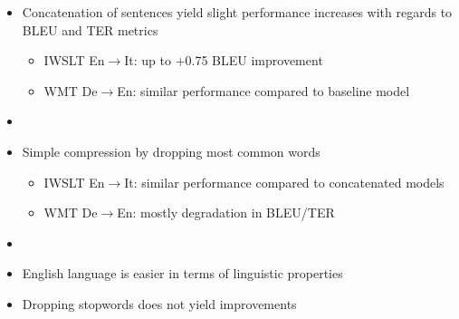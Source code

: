 \documentclass[11pt, a4paper, landscape]{article}
\newcommand{\ToDo}[1]{{\footnotesize \color{red}  $\blacktriangleright$ \big[#1\big]}}
\begin{document}
\NewPage
{}
\vfill
\begin{itemize}
  \item Concatenation of sentences yield slight performance increases with regards to BLEU and TER metrics
  \begin{itemize}
  	\item IWSLT En$\to$It: up to $+$0.75 BLEU improvement
    \item WMT De$\to$En: similar performance compared to baseline model
  \end{itemize}
  \item[]
  \item Simple compression by dropping most common words
  \begin{itemize}
    \item IWSLT En$\to$It: similar performance compared to concatenated models
    \item WMT De$\to$En: mostly degradation in BLEU/TER
  \end{itemize}
  \item[]
  \item English language is easier in terms of linguistic properties
  \item Dropping stopwords does not yield improvements
\end{itemize}
\vspace*{1cm}
\vfill
\end{document}
